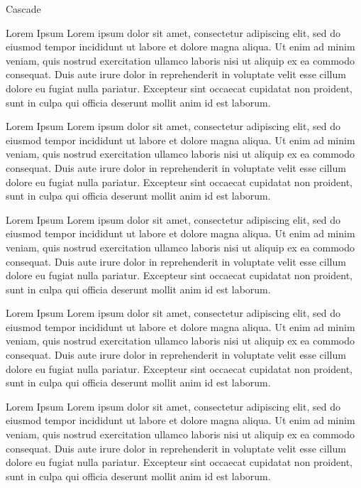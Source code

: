 \begin{titledbox}{Cascade}
    \begin{titledbox}{Lorem Ipsum}
        Lorem ipsum dolor sit amet, consectetur adipiscing elit, sed do
        eiusmod tempor incididunt ut labore et dolore magna aliqua. Ut
        enim ad minim veniam, quis nostrud exercitation ullamco laboris
        nisi ut aliquip ex ea commodo consequat. Duis aute irure dolor
        in reprehenderit in voluptate velit esse cillum dolore eu fugiat
        nulla pariatur. Excepteur sint occaecat cupidatat non proident,
        sunt in culpa qui officia deserunt mollit anim id est laborum.
    \end{titledbox}
    \begin{alertblock}{Lorem Ipsum}
        Lorem ipsum dolor sit amet, consectetur adipiscing elit, sed do
        eiusmod tempor incididunt ut labore et dolore magna aliqua. Ut
        enim ad minim veniam, quis nostrud exercitation ullamco laboris
        nisi ut aliquip ex ea commodo consequat. Duis aute irure dolor
        in reprehenderit in voluptate velit esse cillum dolore eu fugiat
        nulla pariatur. Excepteur sint occaecat cupidatat non proident,
        sunt in culpa qui officia deserunt mollit anim id est laborum.
    \end{alertblock}
    \begin{exampleblock}{Lorem Ipsum}
        Lorem ipsum dolor sit amet, consectetur adipiscing elit, sed do
        eiusmod tempor incididunt ut labore et dolore magna aliqua. Ut
        enim ad minim veniam, quis nostrud exercitation ullamco laboris
        nisi ut aliquip ex ea commodo consequat. Duis aute irure dolor
        in reprehenderit in voluptate velit esse cillum dolore eu fugiat
        nulla pariatur. Excepteur sint occaecat cupidatat non proident,
        sunt in culpa qui officia deserunt mollit anim id est laborum.
    \end{exampleblock}
    \begin{itembox}{Lorem Ipsum}
        Lorem ipsum dolor sit amet, consectetur adipiscing elit, sed do
        eiusmod tempor incididunt ut labore et dolore magna aliqua. Ut
        enim ad minim veniam, quis nostrud exercitation ullamco laboris
        nisi ut aliquip ex ea commodo consequat. Duis aute irure dolor
        in reprehenderit in voluptate velit esse cillum dolore eu fugiat
        nulla pariatur. Excepteur sint occaecat cupidatat non proident,
        sunt in culpa qui officia deserunt mollit anim id est laborum.
    \end{itembox}
    \begin{greenbox}{Lorem Ipsum}
        Lorem ipsum dolor sit amet, consectetur adipiscing elit, sed do
        eiusmod tempor incididunt ut labore et dolore magna aliqua. Ut
        enim ad minim veniam, quis nostrud exercitation ullamco laboris
        nisi ut aliquip ex ea commodo consequat. Duis aute irure dolor
        in reprehenderit in voluptate velit esse cillum dolore eu fugiat
        nulla pariatur. Excepteur sint occaecat cupidatat non proident,
        sunt in culpa qui officia deserunt mollit anim id est laborum.
    \end{greenbox}
\end{titledbox}